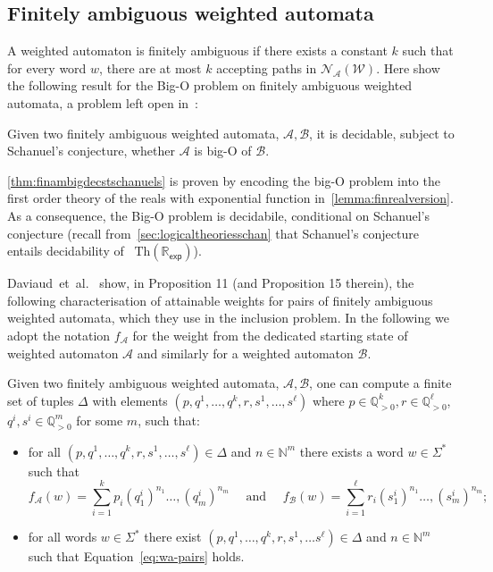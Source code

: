 \documentclass[10pt,a4paper]{amsart}
\numberwithin{equation}{section}
\theoremstyle{plain}
\theoremstyle{definition}
\theoremstyle{remark}
\newcommand\nfa{\mathcal{N}}
\newcommand\wa{\mathcal{W}}
\newcommand\nfaof[2]{\nfa_{#2}(#1)}
\newcommand{\rexp}{$\mathrm{Th}(\mathbb R_{\mathsf{exp}})$}
\begin{document}
\subsection{Finitely ambiguous weighted automata}
A weighted automaton is finitely ambiguous if there exists a constant $k$ such that for every word $w$, there are at most $k$ accepting paths in  $\nfaof{\wa}{\mathcal{A}}$. Here show the following result for the Big-O problem on finitely ambiguous weighted automata, a problem left open in~\cite{ChistikovKMP20}:

\begin{thm}\label{thm:finambigdecstschanuels}
  Given two finitely ambiguous weighted automata, $\mathcal{A},\mathcal{B}$, it is decidable, subject to Schanuel's conjecture, whether $\mathcal{A}$ is big-O of $\mathcal{B}$.
\end{thm}

\cref{thm:finambigdecstschanuels} is proven by encoding the big-O problem into  the first order theory of the reals with exponential function in~\cref{lemma:finrealversion}. As a consequence, the Big-O problem is decidabile, conditional on Schanuel's conjecture (recall from~\cref{sec:logicaltheoriesschan} that Schanuel's conjecture entails decidability of ~\rexp).

Daviaud~et~al.~\cite{DAVIAUD202178} show, in Proposition 11 (and Proposition 15 therein), the following characterisation of attainable weights for pairs of finitely ambiguous weighted automata, which they use in the inclusion problem. In the following we adopt the notation $f_{\mathcal{A}}$ for the weight from the dedicated starting state of weighted automaton $\mathcal{A}$ and similarly for a weighted automaton $\mathcal{B}$.

\begin{thm}
Given two finitely ambiguous weighted automata, $\mathcal{A},\mathcal{B}$, one can compute a finite set of tuples $\Delta$ with elements $({p},{q}^1,\dots, {q}^{k}, {r},{s}^1,\dots, {s}^{\ell})$ where $p\in\mathbb{Q}_{>0}^{k},r\in\mathbb{Q}_{>0}^{\ell}$, $q^{i},s^{i} \in \mathbb{Q}_{>0}^{m}$ for some $m$, such that:
\begin{itemize}
\item for all $({p},{q}^1,\dots, {q}^{k}, {r},{s}^1,\dots, {s}^{\ell}) \in \Delta$ and ${n} \in \mathbb{N}^m$ there exists a word $w\in \Sigma^*$ such that
\begin{equation}
\label{eq:wa-pairs}
f_\mathcal{A}(w) = \sum_{i=1}^{k} p_i{({q}^i_1)}^{n_1}\dots, {({q}^i_m)}^{n_m}
\quad \text{ and } \quad f_\mathcal{B}(w) = \sum_{i=1}^{\ell} r_i{({s}^i_1)}^{n_1}\dots, {({s}^i_m)}^{n_m};
\end{equation}
\item for all words  $w\in \Sigma^*$ there exist  $({p},{q}^1,\dots, {q}^{k}, {r},{s}^1,\dots {s}^{\ell}) \in \Delta$ and ${n} \in \mathbb{N}^m$  such that Equation~\eqref{eq:wa-pairs} holds.
\end{itemize}

\end{thm}
\end{document}
